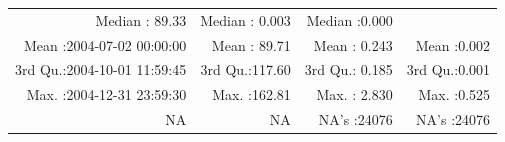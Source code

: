 \documentclass[
  10pt,
  a4paper,oneside]{article}
\begin{document}
\begin{longtable}[]{@{}rrrr@{}}
\begin{minipage}[t]{0.19\columnwidth}
Median : 89.33\strut
\end{minipage} & \begin{minipage}[t]{0.19\columnwidth}\raggedleft
Median : 0.003\strut
\end{minipage} & \begin{minipage}[t]{0.19\columnwidth}\raggedleft
Median :0.000\strut
\end{minipage}\tabularnewline
\begin{minipage}[t]{0.33\columnwidth}\raggedleft
Mean :2004-07-02 00:00:00\strut
\end{minipage} & \begin{minipage}[t]{0.19\columnwidth}\raggedleft
Mean : 89.71\strut
\end{minipage} & \begin{minipage}[t]{0.19\columnwidth}\raggedleft
Mean : 0.243\strut
\end{minipage} & \begin{minipage}[t]{0.19\columnwidth}\raggedleft
Mean :0.002\strut
\end{minipage}\tabularnewline
\begin{minipage}[t]{0.33\columnwidth}\raggedleft
3rd Qu.:2004-10-01 11:59:45\strut
\end{minipage} & \begin{minipage}[t]{0.19\columnwidth}\raggedleft
3rd Qu.:117.60\strut
\end{minipage} & \begin{minipage}[t]{0.19\columnwidth}\raggedleft
3rd Qu.: 0.185\strut
\end{minipage} & \begin{minipage}[t]{0.19\columnwidth}\raggedleft
3rd Qu.:0.001\strut
\end{minipage}\tabularnewline
\begin{minipage}[t]{0.33\columnwidth}\raggedleft
Max. :2004-12-31 23:59:30\strut
\end{minipage} & \begin{minipage}[t]{0.19\columnwidth}\raggedleft
Max. :162.81\strut
\end{minipage} & \begin{minipage}[t]{0.19\columnwidth}\raggedleft
Max. : 2.830\strut
\end{minipage} & \begin{minipage}[t]{0.19\columnwidth}\raggedleft
Max. :0.525\strut
\end{minipage}\tabularnewline
\begin{minipage}[t]{0.33\columnwidth}\raggedleft
NA\strut
\end{minipage} & \begin{minipage}[t]{0.19\columnwidth}\raggedleft
NA\strut
\end{minipage} & \begin{minipage}[t]{0.19\columnwidth}\raggedleft
NA's :24076\strut
\end{minipage} & \begin{minipage}[t]{0.19\columnwidth}\raggedleft
NA's :24076\strut
\end{minipage}\tabularnewline
\bottomrule
\end{longtable}
\end{document}
